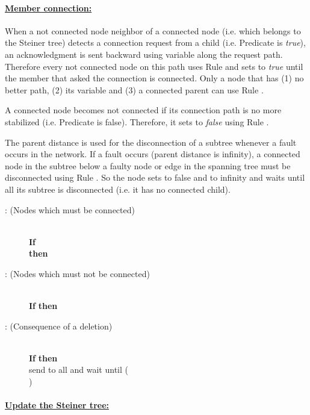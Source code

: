 \documentclass[11pt]{article}
\newcommand{\CRD}{}
\newcommand{\CRE}{}
\newcommand{\CRG}{}
\begin{document}
\paragraph{\underline{Member connection:}}

When a not connected node neighbor of a connected node (i.e. which
belongs to the Steiner tree) detects a connection request from a child
(i.e. Predicate  is \emph{true}), an acknowledgment is sent
backward using variable  along the request path. Therefore
every not connected node 
on this path uses Rule \CRD\/ and sets  to \emph{true} until
the member that asked the connection is connected. Only a node that
has (1) no better path, 
(2) its variable  and (3) a connected parent can use Rule
\CRD.

A connected node becomes not connected if its connection path is no
more stabilized (i.e. Predicate  is false). Therefore, it
sets  to \emph{false} using Rule \CRE.

The parent distance is used for the disconnection of a subtree whenever a
fault occurs in the network. 
If a fault occurs (parent distance is infinity), a connected node in the subtree below a faulty node or edge in the spanning tree must be disconnected using Rule \CRG. So the node sets  to false and  to infinity and waits until all its subtree is disconnected (i.e. it has no connected child).




\begin{small}
\begin{description}
\item[\CRD: (Nodes which must be connected)]~\\\textbf{If} \\
\textbf{then} 
\item[\CRE: (Nodes which must not be connected)]~\\\textbf{If}  
\textbf{then} 
\item[\CRG: (Consequence of a deletion)]~\\
\textbf{If} 
\textbf{then}  \\
\hspace*{1,1cm} send  to all  and wait until (\\ \hspace*{1,2cm})



\end{description}
\end{small}
\paragraph{\underline{Update the Steiner tree:}}
\end{document}
